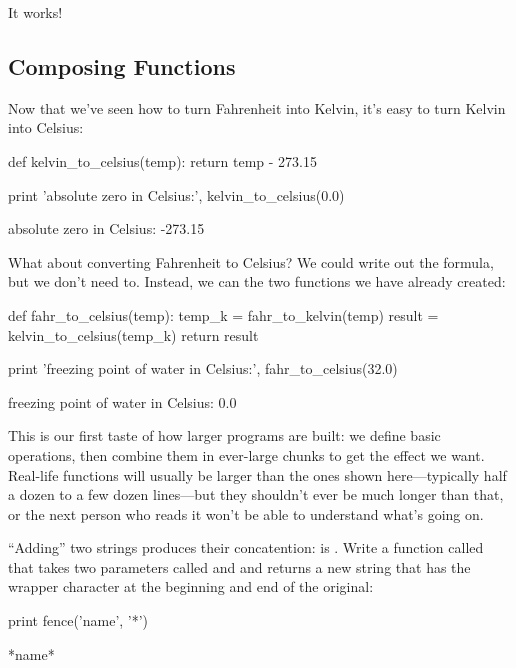 It works!

\subsection{Composing Functions}

Now that we've seen how to turn Fahrenheit into Kelvin, it's easy to
turn Kelvin into Celsius:

\begin{VerbIn}
def kelvin_to_celsius(temp):
    return temp - 273.15

print 'absolute zero in Celsius:', kelvin_to_celsius(0.0)
\end{VerbIn}

\begin{VerbOut}
absolute zero in Celsius: -273.15
\end{VerbOut}

What about converting Fahrenheit to Celsius? We could write out the
formula, but we don't need to. Instead, we can
 the two functions we have
already created:

\begin{VerbIn}
def fahr_to_celsius(temp):
    temp_k = fahr_to_kelvin(temp)
    result = kelvin_to_celsius(temp_k)
    return result

print 'freezing point of water in Celsius:', fahr_to_celsius(32.0)
\end{VerbIn}

\begin{VerbOut}
freezing point of water in Celsius: 0.0
\end{VerbOut}

This is our first taste of how larger programs are built: we define
basic operations, then combine them in ever-large chunks to get the
effect we want. Real-life functions will usually be larger than the ones
shown here---typically half a dozen to a few dozen lines---but they
shouldn't ever be much longer than that, or the next person who reads it
won't be able to understand what's going on.

\begin{challenge}
  ``Adding'' two strings produces their concatention: 
  is . Write a function called  that takes
  two parameters called  and  and
  returns a new string that has the wrapper character at the beginning
  and end of the original:

\begin{VerbIn}
print fence('name', '*')
\end{VerbIn}

\begin{VerbOut}
*name*
\end{VerbOut}
\end{challenge}

